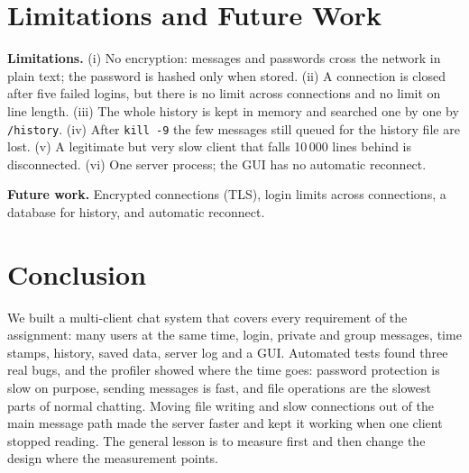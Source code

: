 \documentclass[conference]{IEEEtran}
\newcommand{\code}[1]{\texttt{#1}}
\begin{document}
\section{Limitations and Future Work}
\textbf{Limitations.}
(i) No encryption: messages and passwords cross the network in plain text; the password is hashed only when stored.
(ii) A connection is closed after five failed logins, but there is no limit across connections and no limit on line length.
(iii) The whole history is kept in memory and searched one by one by \code{/history}.
(iv) After \code{kill -9} the few messages still queued for the history file are lost.
(v) A legitimate but very slow client that falls 10\,000 lines behind is disconnected.
(vi) One server process; the GUI has no automatic reconnect.

\textbf{Future work.} Encrypted connections (TLS), login limits across connections, a database for history, and automatic reconnect.

\section{Conclusion}
We built a multi-client chat system that covers every requirement of the assignment: many users at the same time, login, private and group messages, time stamps,
history, saved data, server log and a GUI. Automated tests found three real bugs, and the profiler showed where the time goes: password protection is slow on purpose,
sending messages is fast, and file operations are the slowest parts of normal chatting. Moving file writing and slow connections out of the main message path
made the server faster and kept it working when one client stopped reading. The general lesson is to measure first and then change the design where the measurement points.

\end{document}

